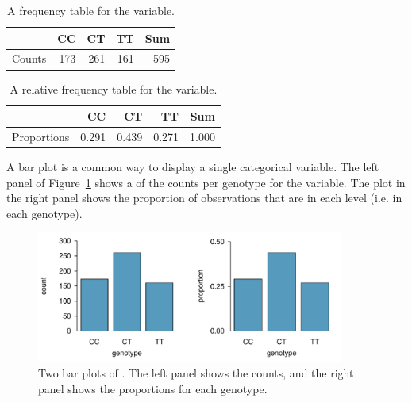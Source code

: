 \begin{table}[ht]
	\centering
	\begin{tabular}{rrrrr}
		\hline
		& CC & CT & TT & Sum \\ 
		\hline
		Counts & 173 & 261 & 161 & 595 \\ 
		\hline
	\end{tabular}
	\caption{A frequency table for the  variable.} 
	\label{famussFrequencyTable}
\end{table}

\begin{table}[ht]
	\centering
	\begin{tabular}{rrrrr}
		\hline
		& CC & CT & TT & Sum \\ 
		\hline
		Proportions & 0.291 & 0.439 & 0.271 & 1.000 \\ 
		\hline
	\end{tabular}
	\caption{A relative frequency table for the  variable.} 
	\label{famussRelFrequencyTable}
\end{table}


A bar plot is a common way to display a single categorical variable. The left panel of Figure~\ref{famussBarPlot} shows a  of the counts per genotype for the  variable. The plot in the right panel shows the proportion of observations that are in each level (i.e. in each genotype).

\begin{figure}[h!]
	\centering
	\includegraphics[width=0.9\textwidth]{ch_intro_to_data_oi_biostat/figures/famussBarPlot/famussBarPlot}
	\caption{Two bar plots of . The left panel shows the counts, and the right panel shows the proportions for each genotype.}
	\label{famussBarPlot}
\end{figure}

